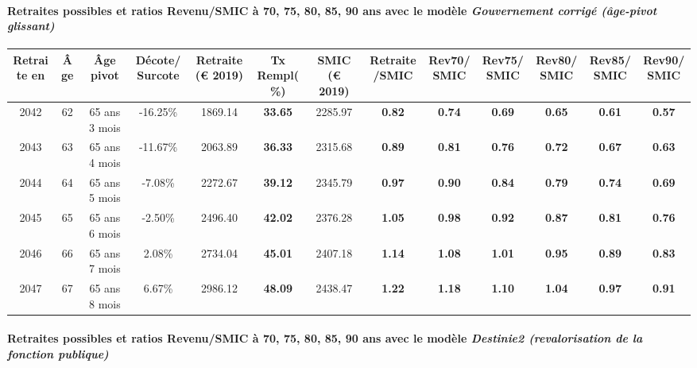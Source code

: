 \paragraph{Retraites possibles et ratios Revenu/SMIC à 70, 75, 80, 85, 90 ans avec le modèle \emph{Gouvernement corrigé (âge-pivot glissant)}}  
 
{ \scriptsize \begin{center} 
\begin{tabular}[htb]{|c|c||c|c||c|c||c||c|c|c|c|c|c|} 
\hline 
 Retraite en &  Âge &  Âge pivot &  Décote/Surcote &  Retraite (\euro{} 2019) &  Tx Rempl(\%) &  SMIC (\euro{} 2019) &  Retraite/SMIC &  Rev70/SMIC &  Rev75/SMIC &  Rev80/SMIC &  Rev85/SMIC &  Rev90/SMIC \\ 
\hline \hline 
 2042 &  62 &  65 ans 3 mois &  -16.25\% &  1869.14 &  {\bf 33.65} &  2285.97 &  {\bf {\color{red} 0.82}} &  {\bf {\color{red} 0.74}} &  {\bf {\color{red} 0.69}} &  {\bf {\color{red} 0.65}} &  {\bf {\color{red} 0.61}} &  {\bf {\color{red} 0.57}} \\ 
\hline 
 2043 &  63 &  65 ans 4 mois &  -11.67\% &  2063.89 &  {\bf 36.33} &  2315.68 &  {\bf {\color{red} 0.89}} &  {\bf {\color{red} 0.81}} &  {\bf {\color{red} 0.76}} &  {\bf {\color{red} 0.72}} &  {\bf {\color{red} 0.67}} &  {\bf {\color{red} 0.63}} \\ 
\hline 
 2044 &  64 &  65 ans 5 mois &  -7.08\% &  2272.67 &  {\bf 39.12} &  2345.79 &  {\bf {\color{red} 0.97}} &  {\bf {\color{red} 0.90}} &  {\bf {\color{red} 0.84}} &  {\bf {\color{red} 0.79}} &  {\bf {\color{red} 0.74}} &  {\bf {\color{red} 0.69}} \\ 
\hline 
 2045 &  65 &  65 ans 6 mois &  -2.50\% &  2496.40 &  {\bf 42.02} &  2376.28 &  {\bf 1.05} &  {\bf {\color{red} 0.98}} &  {\bf {\color{red} 0.92}} &  {\bf {\color{red} 0.87}} &  {\bf {\color{red} 0.81}} &  {\bf {\color{red} 0.76}} \\ 
\hline 
 2046 &  66 &  65 ans 7 mois &  2.08\% &  2734.04 &  {\bf 45.01} &  2407.18 &  {\bf 1.14} &  {\bf 1.08} &  {\bf 1.01} &  {\bf {\color{red} 0.95}} &  {\bf {\color{red} 0.89}} &  {\bf {\color{red} 0.83}} \\ 
\hline 
 2047 &  67 &  65 ans 8 mois &  6.67\% &  2986.12 &  {\bf 48.09} &  2438.47 &  {\bf 1.22} &  {\bf 1.18} &  {\bf 1.10} &  {\bf 1.04} &  {\bf {\color{red} 0.97}} &  {\bf {\color{red} 0.91}} \\ 
\hline 
\hline 
\end{tabular} 
\end{center} } 
\paragraph{Retraites possibles et ratios Revenu/SMIC à 70, 75, 80, 85, 90 ans avec le modèle \emph{Destinie2 (revalorisation de la fonction publique)}}  
 
